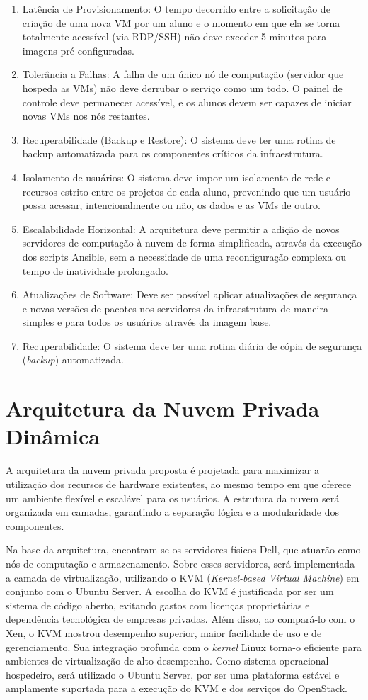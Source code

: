 \begin{enumerate}
\item Latência de Provisionamento: O tempo decorrido entre a solicitação de criação de uma nova VM por um aluno e o momento em que ela se torna totalmente acessível (via RDP/SSH) não deve exceder 5 minutos para imagens pré-configuradas.
\item Tolerância a Falhas: A falha de um único nó de computação (servidor que hospeda as VMs) não deve derrubar o serviço como um todo. O painel de controle deve permanecer acessível, e os alunos devem ser capazes de iniciar novas VMs nos nós restantes.
\item Recuperabilidade (Backup e Restore): O sistema deve ter uma rotina de backup automatizada para os componentes críticos da infraestrutura.
\item Isolamento de usuários: O sistema deve impor um isolamento de rede e recursos estrito entre os projetos de cada aluno, prevenindo que um usuário possa acessar, intencionalmente ou não, os dados e as VMs de outro.
\item Escalabilidade Horizontal: A arquitetura deve permitir a adição de novos servidores de computação à nuvem de forma simplificada, através da execução dos scripts Ansible, sem a necessidade de uma reconfiguração complexa ou tempo de inatividade prolongado.
\item Atualizações de Software: Deve ser possível aplicar atualizações de segurança e novas versões de pacotes nos servidores da infraestrutura de maneira simples e para todos os usuários através da imagem base.
\item Recuperabilidade: O sistema deve ter uma rotina diária de cópia de segurança (\textit{backup}) automatizada.
\end{enumerate}

\section{Arquitetura da Nuvem Privada Dinâmica}

A arquitetura da nuvem privada proposta é projetada para maximizar a utilização dos recursos de hardware existentes, ao mesmo tempo em que oferece um ambiente flexível e escalável para os usuários. A estrutura da nuvem será organizada em camadas, garantindo a separação lógica e a modularidade dos componentes.

Na base da arquitetura, encontram-se os servidores físicos Dell, que atuarão como nós de computação e armazenamento. Sobre esses servidores, será implementada a camada de virtualização, utilizando o KVM (\textit{Kernel-based Virtual Machine}) em conjunto com o Ubuntu Server. A escolha do KVM é justificada por ser um sistema de código aberto, evitando gastos com licenças proprietárias e dependência tecnológica de empresas privadas. Além disso, ao compará-lo com o Xen, o KVM mostrou desempenho superior, maior facilidade de uso e de gerenciamento. Sua integração profunda com o \textit{kernel} Linux torna-o eficiente para ambientes de virtualização de alto desempenho. Como sistema operacional hospedeiro, será utilizado o Ubuntu Server, por ser uma plataforma estável e amplamente suportada para a execução do KVM e dos serviços do OpenStack.

